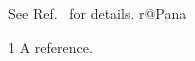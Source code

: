 \newcommand{\Ref}[1]{\csname r@#1\endcsname}

See Ref.~\cite{Pana} for details. \Ref{Pana}
\begin{thebibliography}{1}
 A reference.
\end{thebibliography}

